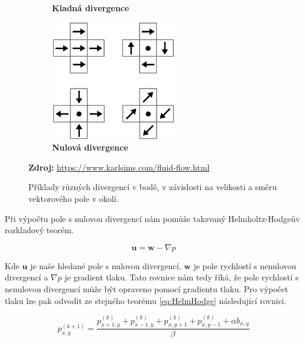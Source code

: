 \begin{figure}[h]
\begin{subfigure}{.3\textwidth}
	\caption{\textbf{Kladná divergence}}
	\label{fig:Lagran}
\end{subfigure}
\begin{subfigure}{.3\textwidth}
  	\centering
	\includegraphics[width=0.8\linewidth]{obrazky-figures/div-zero.png}
	\caption{\textbf{Nulová divergence}}
	\label{fig:Lagran}
\end{subfigure}
\caption{Příklady různých divergencí v bodě, v závislosti na velikosti a směru vektorového pole v okolí.}
\textbf{Zdroj:} \url{https://www.karlsims.com/fluid-flow.html}
\label{fig:div}
\end{figure}

Při výpočtu pole s nulovou divergencí nám pomůže takzvaný Helmholtz-Hodgeův rozkladový teorém.

\begin{equation}
\mathbf{u} = \mathbf{w} - \nabla p    
\label{eq:HelmHodge}
\end{equation}

Kde $\mathbf{u}$ je naše hledané pole s nulovou divergencí, $\mathbf{w}$ je pole rychlostí s nenulovou divergencí a $\nabla p$ je gradient tlaku. Tato rovnice nám tedy říká, že pole rychlostí s nenulovou divergencí může být opraveno pomocí gradientu tlaku. Pro výpočet tlaku lze pak odvodit ze stejného teorému \ref{eq:HelmHodge} následující rovnici. \cite{webglFluid}

\begin{equation}
    p_{x,y}^{(k+1)} = \frac{p_{x+1,y}^{(k)} + p_{x-1,y}^{(k)} + p_{x,y+1}^{(k)} + p_{x,y-1}^{(k)} + \alpha b_{x,y}}{\beta}
\end{equation}

